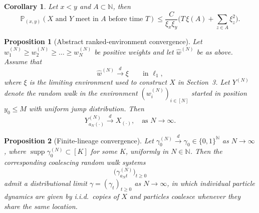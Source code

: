 \documentclass[10pt,a4paper]{amsart}
\newtheorem{corollary}{Corollary}
\newtheorem{proposition}{Proposition}
\newcommand{\bN}{\ensuremath{\mathbb{N}}}
\newcommand{\bP}{\ensuremath{\mathbb{P}}}
\DeclareMathOperator{\supp}{supp}
\begin{document}
\begin{corollary}\label{cor:meetingbound}
Let $x<y$ and $A\subset \bN$, then
$$\bP_{(x,y)}(X \text{ and } Y \text{ meet in } A \text{ before time }T)\leq \frac{C}{\xi_x\xi_y}\big(T \,\xi(A)  +{\sum_{z\in A}\xi_z^2}\big).$$
\end{corollary}

\begin{proposition}[Abstract ranked-environment convergence]\label{prop:convYtoX}
	Let $w^{(N)}_1\geq w^{(N)}_2\geq\dots\geq w^{(N)}_N$ be positive weights and let $\widehat{w}^{(N)}$ be as above. Assume that
	\[
	\widehat{w}^{(N)}\overset{d}{\longrightarrow}\xi \qquad \text{in }\ell_1,
	\]
	where $\xi$ is the limiting environment used to construct $X$ in Section~3. Let $Y^{(N)}$ denote the random walk in the environment $(w^{(N)}_i)_{i\in[N]}$ started in position $y_0\leq M$ with uniform jump distribution. Then
	\[
	Y^{(N)}_{a_N(\cdot)}\overset{d}{\longrightarrow} X_{(\cdot)},\quad\mbox{as }N\to\infty.
	\]
\end{proposition}

\begin{proposition}[Finite-lineage convergence]\label{prop:convYtoXfinite}
Let $\gamma_0^{(N)}\overset{d}{\to}\gamma_0\in\{0,1\}^{\bN}$ as $N\to\infty$, where $\supp \gamma_0^{(N)}\subset[K]$ for some $K$, uniformly in $N\in\bN$. Then the corresponding coalescing random walk systems 
\[
\big(\gamma_{a_N t}^{(N)}\big)_{t\geq 0}
\]
admit a distributional limit $\gamma=(\gamma_{t})_{t\geq 0}$ as $N\to\infty$, in which individual particle dynamics are given by i.i.d.\ copies of $X$ and particles coalesce whenever they share the same location.
\end{proposition}
\end{document}
